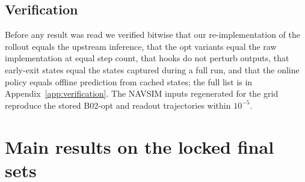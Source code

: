\documentclass[10pt]{article}
\begin{document}
\subsection{Verification}
\label{sec:verification}

Before any result was read we verified bitwise that our re-implementation of the rollout equals the upstream inference, that the opt variants equal the raw implementation at equal step count, that hooks do not perturb outputs, that early-exit states equal the states captured during a full run, and that the online policy equals offline prediction from cached states; the full list is in Appendix~\ref{app:verification}. The NAVSIM inputs regenerated for the grid reproduce the stored B02-opt and readout trajectories within $10^{-5}$.

\section{Main results on the locked final sets}
\label{sec:main}
\end{document}
